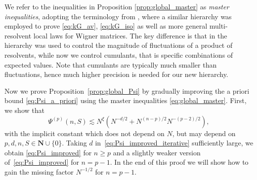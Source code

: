 \documentclass[10pt]{amsart}
\numberwithin{equation}{section}
\newcommand{\nc}{\normalcolor}
\newcommand{\N}{\mathbf{N}}
\begin{document}
We refer to the inequalities in Proposition \ref{prop:global_master} as \emph{master inequalities}, adopting the terminology from \cite{Multi_res_llaws}, where a similar hierarchy \cite[Eq. (3.20a), (3.20b)]{Multi_res_llaws} was employed to prove \eqref{eq:kG_av}, \eqref{eq:kG_iso} as well as more general multi-resolvent local laws for Wigner matrices. The key difference is that in \cite{Multi_res_llaws} the hierarchy was used to control the magnitude of fluctuations of a product of resolvents, while now we control cumulants, that is specific combinations of expected values. Note that cumulants are typically much smaller than fluctuations, hence much higher precision is needed for our new hierarchy.


Now we prove Proposition~\ref{prop:global_Psi} by gradually improving the a priori bound \eqref{eq:Psi_a_priori} using the master inequalities \eqref{eq:global_master}. First, we show that
\begin{equation}
\Psi^{(p)}(n,S)\lesssim N^\xi\left( N^{-d/2} + N^{(n-p)/2}N^{-(p-2)/2}\right),
\label{eq:Psi_improved_iterative}
\end{equation}
 with the implicit constant which does not depend on $N$,
but may depend on $p,d,n,S\in\N\cup\{0\}$. \nc Taking $d$ in~\eqref{eq:Psi_improved_iterative} sufficiently large, we obtain \eqref{eq:Psi_improved} for $n\ge p$ and a slightly weaker version of~\eqref{eq:Psi_improved} for $n= p-1$. In the end of this proof we will show how to gain the missing factor $N^{-1/2}$ for $n=p-1$.
\end{document}
